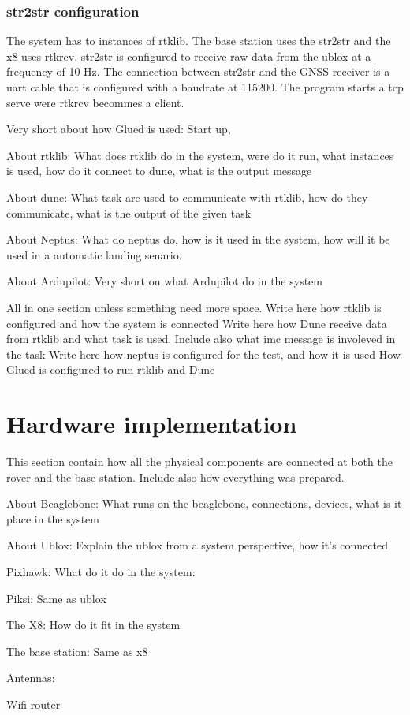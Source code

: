 \subsubsection{str2str configuration}
The system has to instances of rtklib. The base station uses the str2str and the x8 uses rtkrcv. str2str is configured to receive raw data from the ublox at a frequency of 10 Hz. The connection between str2str and the GNSS receiver is a uart cable that is configured with a baudrate at 115200. The program starts a tcp serve were rtkrcv becommes a client.

Very short about how Glued is used: Start up, 

About rtklib: What does rtklib do in the system, were do it run, what instances is used, how do it connect to dune, what is the output message

About dune: What task are used to communicate with rtklib, how do they communicate, what is the output of the given task

About Neptus: What do neptus do, how is it used in the system, how will it be used in a automatic landing senario.

About Ardupilot: Very short on what Ardupilot do in the system 



All in one section unless something need more space.
Write here how rtklib is configured and how the system is connected
Write here how Dune receive data from rtklib and what task is used. Include also what imc message is involeved in the task
Write here how neptus is configured for the test, and how it is used
How Glued is configured to run rtklib and Dune
\section{Hardware implementation}



This section contain how all the physical components are connected at both the rover and the base station. Include also how everything was prepared.

About Beaglebone: What runs on the beaglebone, connections, devices, what is it place in the system

About Ublox: Explain the ublox from a system perspective, how it's connected

Pixhawk: What do it do in the system:

Piksi: Same as ublox

The X8: How do it fit in the system

The base station: Same as x8

Antennas: 

Wifi router

